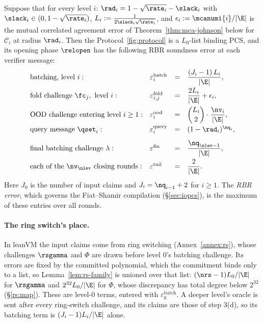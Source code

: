 \begin{theorem}\label{thm:rbr}
Suppose that for every level $i$: $\rad_i = 1 - \sqrt{\rate_i} - \slack_i$ with $\slack_i \in (0, 1-\sqrt{\rate_i})$, $L_i := \tfrac{1}{2\slack_i\sqrt{\rate_i}}$, and $\epsilon_i := \mcanumi{i}/|\E|$ is the mutual correlated agreement error of Theorem~\ref{thm:mca-johnson} below for $\mathcal{C}_i$ at radius $\rad_i$. Then the Protocol~\ref{fig:protocol} is a $L_0$-list binding PCS, and its opening phase $\relopen$ has the following RBR soundness error at each verifier message:
\[
\begin{array}{llcl}
\textnormal{batching, level } i: & \varepsilon^{\mathrm{batch}}_i &=& \dfrac{(J_i - 1)\, L_i}{|\E|} , \\[2ex]
\textnormal{fold challenge } \fc_j, \textnormal{ level } i: & \varepsilon^{\mathrm{fold}}_{i,j} &=& \dfrac{2 L_i}{|\E|} + \epsilon_i , \\[2ex]
\textnormal{OOD challenge entering level } i \ge 1: & \varepsilon^{\mathrm{ood}}_i &=& \dbinom{L_i}{2} \cdot \dfrac{\nv_i}{|\E|} , \\[2ex]
\textnormal{query message } \qset_i: & \varepsilon^{\mathrm{query}}_i &=& (1 - \rad_i)^{\nq_i} , \\[2ex]
\textnormal{final batching challenge } \lambda: & \varepsilon^{\mathrm{fin}} &=& \dfrac{\nq_{\nlev-1}}{|\E|} , \\[2ex]
\textnormal{each of the } \nv_\nlev \textnormal{ closing rounds}: & \varepsilon^{\mathrm{tail}} &=& \dfrac{2}{|\E|} .
\end{array}
\]
Here $J_0$ is the number of input claims and $J_i = \nq_{i-1} + 2$ for $i \ge 1$. The \emph{RBR error}, which governs the Fiat--Shamir compilation (\S\ref{sec:iopcs}), is the maximum of these entries over all rounds.
\end{theorem}

\paragraph{The ring switch's place.} In leanVM the input claims come from ring switching (Annex~\ref{annex:rs}), whose challenges $\rsgamma$ and $\Phi$ are drawn before level $0$'s batching challenge. Its errors are fixed by the committed polynomial, which the commitment binds only to a list, so Lemma~\ref{lem:rs-family} is unioned over that list: $(\nrs - 1) L_0/|\E|$ for $\rsgamma$ and $2^{32} L_0/|\E|$ for $\Phi$, whose discrepancy has total degree below $2^{32}$ (\S\ref{rs:map}). These are level-$0$ terms, entered with $\varepsilon^{\mathrm{batch}}_0$. A deeper level's oracle is sent after every ring-switch challenge, and its claims are those of step 3(d), so its batching term is $(J_i - 1) L_i/|\E|$ alone.

